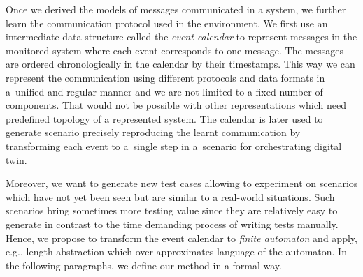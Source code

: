{Once we derived the models of messages communicated in a system, we further
learn the communication protocol used in the environment.
%
We first use an intermediate data structure called the \emph{event calendar} to
represent messages in the monitored system where each event corresponds to one
message.
%
The messages are ordered chronologically in the calendar by their timestamps.
%
This way we can represent the communication using different protocols and data
formats in a~unified and regular manner and we are not limited to a
fixed number of components.
That would not be possible with other representations which need predefined
topology of a represented system.
%
The calendar is later used to generate scenario precisely reproducing the learnt
communication by transforming each event to a~single step in a~scenario for
orchestrating digital twin.
%

Moreover, we want to generate new test cases allowing to experiment on
scenarios which have not yet been seen but are similar to a real-world
situations.
%
Such scenarios bring sometimes more testing value since they are relatively
easy to generate in contrast to the time demanding process of writing
tests manually.
%
Hence, we propose to transform the event calendar to \emph{finite
automaton} and apply, e.g., length abstraction which over-approximates language
of the automaton.
In the following paragraphs, we define our method in a formal way.

}
